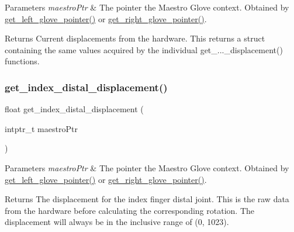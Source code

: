 \begin{DoxyParams}{Parameters}
{\em maestro\+Ptr} & The pointer the Maestro Glove context. Obtained by \hyperlink{group__glove_management_ga63ce3c99d4a8b8db851b22af9185764e}{get\+\_\+left\+\_\+glove\+\_\+pointer()} or \hyperlink{group__glove_management_ga9b8fd9d91aeac3f8da50f7a7eba0c32b}{get\+\_\+right\+\_\+glove\+\_\+pointer()}. \\
\hline
\end{DoxyParams}
\begin{DoxyReturn}{Returns}
Current displacements from the hardware. This returns a struct containing the same values acquired by the individual {\ttfamily get\+\_\+...\+\_\+displacement()} functions. 
\end{DoxyReturn}
\mbox{\label{group__displacement_access_gac9901dae93434d4fc030170a45fae2f1}} 
\subsubsection{\texorpdfstring{get\+\_\+index\+\_\+distal\+\_\+displacement()}{get\_index\_distal\_displacement()}}
{\footnotesize\ttfamily float get\+\_\+index\+\_\+distal\+\_\+displacement (\begin{DoxyParamCaption}\item[{intptr\+\_\+t}]{maestro\+Ptr }\end{DoxyParamCaption})}


\begin{DoxyParams}{Parameters}
{\em maestro\+Ptr} & The pointer the Maestro Glove context. Obtained by \hyperlink{group__glove_management_ga63ce3c99d4a8b8db851b22af9185764e}{get\+\_\+left\+\_\+glove\+\_\+pointer()} or \hyperlink{group__glove_management_ga9b8fd9d91aeac3f8da50f7a7eba0c32b}{get\+\_\+right\+\_\+glove\+\_\+pointer()}. \\
\hline
\end{DoxyParams}
\begin{DoxyReturn}{Returns}
The displacement for the index finger distal joint. This is the raw data from the hardware before calculating the corresponding rotation. The displacement will always be in the inclusive range of (0, 1023). 
\end{DoxyReturn}
\mbox{\label{group__displacement_access_gaa1bfb69dab314ccf7e6dc1df6d3657bc}} 
